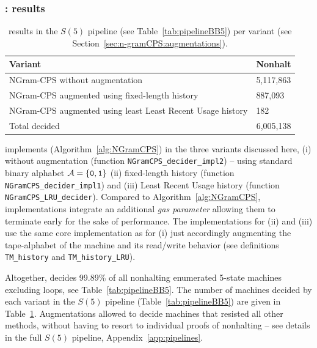 \subsubsection{\ngramcps: results}\label{sec:n-gramCPS:results}
\begin{table}[h!]
    \centering
    \begin{tabular}{ll}
        Variant                                                    & Nonhalt                       \\  \hline
        NGram-CPS without augmentation                             & 5,117,863                     \\
        NGram-CPS augmented using fixed-length history             & 887,093                       \\
        NGram-CPS augmented using least Least Recent Usage history & 182                           \\ \hline
        Total decided                                              & \multicolumn{1}{r}{6,005,138}
    \end{tabular}
    \caption{\ngramcps results in the $S(5)$ pipeline (see Table~\ref{tab:pipelineBB5}) per variant (see Section~\ref{sec:n-gramCPS:augmentations}).}\label{tab:ngramcps:results}
\end{table}

\CoqBB implements \ngramcps (Algorithm~\ref{alg:NGramCPS}) in the three variants discussed here, (i) without augmentation (function \texttt{NGramCPS\_decider\_impl2}) -- \ie using standard binary alphabet $\mathcal{A}=\{\texttt{0},\texttt{1}\}$ (ii) fixed-length history (function \texttt{NGramCPS\_decider\_impl1}) and (iii) Least Recent Usage history (function \texttt{NGramCPS\_LRU\_decider}). Compared to Algorithm~\ref{alg:NGramCPS}, \CoqBB implementations integrate an additional \textit{gas parameter} allowing them to terminate early for the sake of performance. The implementations for (ii) and (iii) use the same core implementation as for (i) just accordingly augmenting the tape-alphabet of the machine and its read/write behavior (see definitions \texttt{TM\_history} and \texttt{TM\_history\_LRU}).

Altogether, \ngramcps decides 99.89\% of all nonhalting enumerated 5-state machines excluding loops, see Table~\ref{tab:pipelineBB5}. The number of machines decided by each \ngramcps variant in the $S(5)$ pipeline (Table~\ref{tab:pipelineBB5}) are given in Table~\ref{tab:ngramcps:results}. Augmentations allowed to decide machines that resisted all other methods, without having to resort to individual proofs of nonhalting -- see details in the full $S(5)$ pipeline, Appendix~\ref{app:pipelines}.

